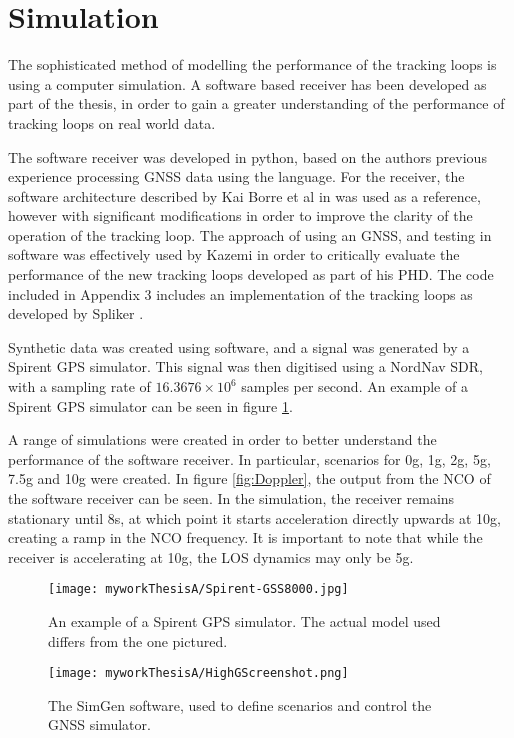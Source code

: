 \section{Simulation}

The sophisticated method of modelling the performance of the tracking loops is using a computer simulation. A software based receiver has been developed as part of the thesis, in order to gain a greater understanding of the performance of tracking loops on real world data. 

The software receiver was developed in python, based on the authors previous experience processing GNSS data using the language. For the receiver, the software architecture described by Kai Borre et al in \cite{KaiBorre} was used as a reference, however with significant modifications in order to improve the clarity of the operation of the tracking loop. The approach of using an \ac{GNSS}, and testing in software was effectively used by Kazemi \cite{KazemiPHD} in order to critically evaluate the performance of the new tracking loops developed as part of his PHD. The code included in Appendix 3 includes an implementation of the tracking loops as developed by Spliker \cite{Spilker}.

Synthetic data was created using software, and a signal was generated by a Spirent \ac{GPS} simulator. This signal was then digitised using a NordNav \ac{SDR}, with a sampling rate of $16.3676 \times 10^6$ samples per second. An example of a Spirent \ac{GPS} simulator can be seen in figure \ref{fig:Spirent}.

A range of simulations were created in order to better understand the performance of the software receiver. In particular, scenarios for 0g, 1g, 2g, 5g, 7.5g and 10g were created. In figure \ref{fig:Doppler}, the output from the \ac{NCO} of the software receiver can be seen. In the simulation, the receiver remains stationary until 8s, at which point it starts acceleration directly upwards at 10g, creating a ramp in the \ac{NCO} frequency. It is important to note that while the receiver is accelerating at 10g, the \ac{LOS} dynamics may only be 5g. 

\begin{figure}[!htb] 
    \centering
    \texttt{[image: myworkThesisA/Spirent-GSS8000.jpg]} 
    \caption{An example of a Spirent \ac{GPS} simulator. The actual model used differs from the one pictured.}
    \label{fig:Spirent}
\end{figure}

\begin{figure}[!htb] 
    \centering
    \texttt{[image: myworkThesisA/HighGScreenshot.png]} 
    \caption{The SimGen software, used to define scenarios and control the \ac{GNSS} simulator.}
    \label{fig:HighGScreenshot}
\end{figure}


